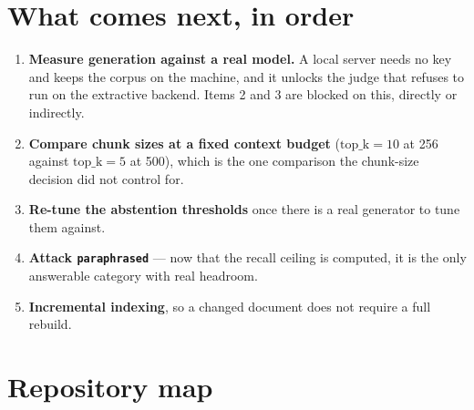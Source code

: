 \documentclass[11pt,a4paper]{article}
\newcommand{\code}[1]{\texttt{\small #1}}
\begin{document}
\section{What comes next, in order}

\begin{enumerate}[leftmargin=1.4em,itemsep=3pt]
  \item \textbf{Measure generation against a real model.} A local server needs no
        key and keeps the corpus on the machine, and it unlocks the judge that
        refuses to run on the extractive backend. Items 2 and 3 are blocked on
        this, directly or indirectly.
  \item \textbf{Compare chunk sizes at a fixed context budget}
        ($\mathrm{top\_k}=10$ at 256 against $\mathrm{top\_k}=5$ at 500), which is
        the one comparison the chunk-size decision did not control for.
  \item \textbf{Re-tune the abstention thresholds} once there is a real generator
        to tune them against.
  \item \textbf{Attack \code{paraphrased}} --- now that the recall ceiling is
        computed, it is the only answerable category with real headroom.
  \item \textbf{Incremental indexing}, so a changed document does not require a
        full rebuild.
\end{enumerate}

\appendix
\section{Repository map}
\end{document}
